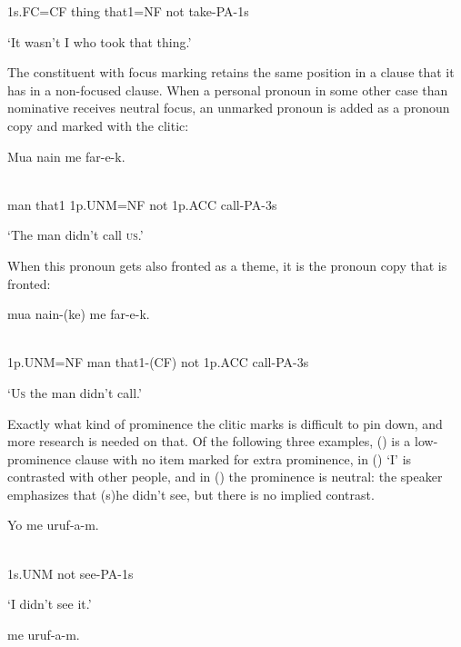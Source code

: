1s.FC=CF  thing  that1=NF  not  take-PA-1s

`It wasn't I who took that thing.'

The constituent with focus marking retains the same position in a clause that it has in a non-focused clause. When a personal pronoun in some other case than nominative receives neutral focus, an unmarked pronoun is added as a pronoun copy and marked with the  clitic:

\ea%
\label{ex:x1743}
\gll Mua  nain    me    far-e-k. \\
      \\
\glt
\z

man  that1  1p.UNM=NF  not  1p.ACC  call-PA-3s

`The man didn't call \textsc{us}.'

When this pronoun gets also fronted as a theme, it is the pronoun copy that is fronted:

\ea%
\label{ex:x1744}
\gll {}  mua  nain-(ke)  me    far-e-k. \\
      \\
\glt
\z

1p.UNM=NF  man  that1-(CF)  not  1p.ACC  call-PA-3s

`\textsc{Us}  the man didn't call.'

Exactly what kind of prominence the  clitic marks is difficult to pin down, and more research is needed on that. Of the following three examples, () is a low-prominence clause with no item marked for extra prominence, in () `I' is contrasted with other people, and in () the prominence is neutral: the speaker emphasizes that (s)he didn't see, but there is no implied contrast. 

\ea%
\label{ex:x1734}
\gll Yo  me  uruf-a-m. \\
      \\
\glt
\z

1s.UNM  not  see-PA-1s

`I didn't see it.'

\ea%
\label{ex:x1735}
\gll {}  me  uruf-a-m. \\
      \\
\glt
\z

